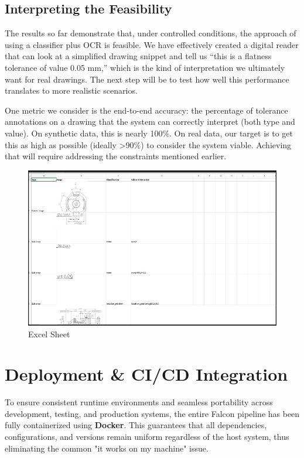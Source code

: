 \documentclass[11pt,a4paper]{article}
\begin{document}
\subsection*{Interpreting the Feasibility}
The results so far demonstrate that, under controlled conditions, the approach of using a classifier plus OCR is feasible. We have effectively created a digital reader that can look at a simplified drawing snippet and tell us “this is a flatness tolerance of value 0.05 mm,” which is the kind of interpretation we ultimately want for real drawings. The next step will be to test how well this performance translates to more realistic scenarios.

One metric we consider is the end-to-end accuracy: the percentage of tolerance annotations on a drawing that the system can correctly interpret (both type and value). On synthetic data, this is nearly 100\%. On real data, our target is to get this as high as possible (ideally \textgreater 90\%) to consider the system viable. Achieving that will require addressing the constraints mentioned earlier.

\begin{figure}[h!]
  \centering
    \includegraphics[width=\textwidth]{Excell.png}%
  \caption{Excel Sheet}
  \label{fig:Excel Sheet}
\end{figure}

\section{Deployment \& CI/CD Integration}
To ensure consistent runtime environments and seamless portability across development, testing, and production systems, the entire Falcon pipeline has been fully containerized using \textbf{Docker}. This guarantees that all dependencies, configurations, and versions remain uniform regardless of the host system, thus eliminating the common "it works on my machine" issue.
\end{document}
